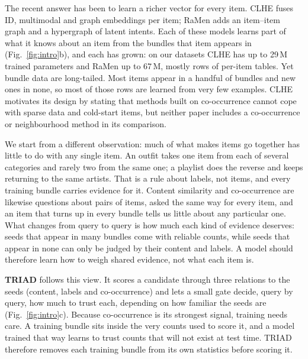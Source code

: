 \documentclass[runningheads]{llncs}
\begin{document}
The recent answer has been to learn a richer vector for every item. CLHE \cite{clhe} fuses ID, multimodal and graph
embeddings per item; RaMen \cite{ramen} adds an item--item graph and a hypergraph of latent intents. Each of these
models learns part of what
it knows about an item from the bundles that item appears in (Fig.~\ref{fig:intro}b), and each has grown: on our
datasets CLHE has up to 29\,M trained parameters and RaMen up to 67\,M, mostly rows of per-item tables. Yet bundle
data are long-tailed. Most items appear in a handful of bundles and new ones in none, so most of those rows are
learned from very few examples. CLHE motivates its design by stating that methods built on co-occurrence cannot cope
with sparse data and cold-start items, but neither paper includes a co-occurrence or neighbourhood method in its
comparison.

We start from a different observation: much of what makes items go together has little to do with any single item.
An outfit takes one item from each of several categories and rarely two from the same one; a playlist does the
reverse and keeps returning to the same artists. That is a rule about labels, not items, and every training bundle
carries evidence for it. Content similarity and co-occurrence are likewise questions about pairs of items, asked the
same way for every item, and an item that turns up in every bundle tells us little about any particular one. What
changes from query to query is how much each kind of evidence deserves: seeds that appear in many bundles come with
reliable counts, while seeds that appear in none can only be judged by their content and labels. A model should
therefore learn how to weigh shared evidence, not what each item is.

\textbf{TRIAD} follows this view. It scores a candidate through three relations to the seeds (content, labels and
co-occurrence) and lets a small gate decide, query by query, how much to trust each, depending on how familiar the
seeds are (Fig.~\ref{fig:intro}c). Because co-occurrence is its strongest signal, training needs care. A training
bundle sits inside the very counts used to score it, and a model trained that way learns to trust counts that will
not exist at test time. TRIAD therefore removes each training bundle from its own statistics before scoring it.
\end{document}
